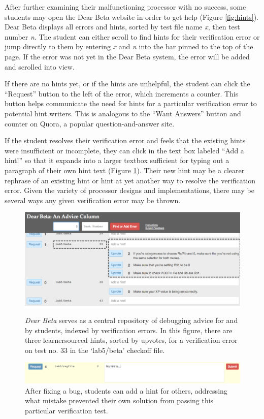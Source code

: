 After further examining their malfunctioning processor with no success, some students may open the Dear Beta website in order to get help (Figure \ref{fig:hints}). Dear Beta displays all errors and hints, sorted by test file name {\it x}, then test number {\it n}. The student can either scroll to find hints for their verification error or jump directly to them by entering {\it x} and {\it n} into the bar pinned to the top of the page. If the error was not yet in the Dear Beta system, the error will be added and scrolled into view. 

If there are no hints yet, or if the hints are unhelpful, the student can click the ``Request'' button to the left of the error, which increments a counter. This button helps communicate the need for hints for a particular verification error to potential hint writers. This is analogous to the ``Want Answers'' button and counter on Quora, a popular question-and-answer site. 

If the student resolves their verification error and feels that the existing hints were insufficient or incomplete, they can click in the text box labeled ``Add a hint!'' so that it expands into a larger textbox sufficient for typing out a paragraph of their own hint text (Figure \ref{fig:contrib}). Their new hint may be a clearer rephrase of an existing hint or hint at yet another way to resolve the verification error. Given the variety of processor designs and implementations, there may be several ways any given verification error may be thrown. 

\begin{figure}
\centering
\includegraphics[width=1.0\columnwidth]{Body/figures/classoverflow/hints_modified.png}
\caption{{\it Dear Beta} serves as a central repository of debugging advice for and by students, indexed by verification errors. In this figure, there are three learnersourced hints, sorted by upvotes, for a verification error on test no. 33 in the `lab5/beta' checkoff file.}
\label{fig:hints}

\bigskip
\centering
\includegraphics[width=1.0\columnwidth]{Body/figures/classoverflow/contrib_shortened.png}
\caption{After fixing a bug, students can add a hint for others, addressing what mistake prevented their own solution from passing this particular verification test.}
\label{fig:contrib}
\end{figure}

